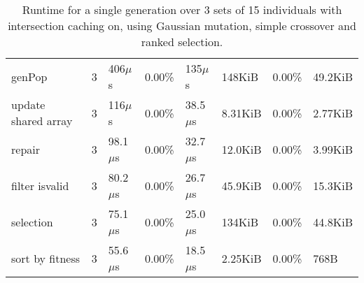 \begin{appendices}
\begin{table}
\begin{tabular}{l l l l l l l l}
     \hspace{12pt}genPop                      &   3  &  406\(\mu\)s & 0.00\% &  135\(\mu\)s   & 148KiB  &0.00\%  &49.2KiB\\
     \hspace{12pt}update shared array         &   3  &  116\(\mu\)s & 0.00\% & 38.5\(\mu\)s   &8.31KiB  &0.00\%  &2.77KiB\\
     \hspace{12pt}repair                      &   3  & 98.1\(\mu\)s & 0.00\% & 32.7\(\mu\)s   &12.0KiB  &0.00\%  &3.99KiB\\
     \hspace{12pt}filter isvalid              &   3  & 80.2\(\mu\)s & 0.00\% & 26.7\(\mu\)s   &45.9KiB  &0.00\%  &15.3KiB\\
     \hspace{12pt}selection                   &   3  & 75.1\(\mu\)s & 0.00\% & 25.0\(\mu\)s   & 134KiB  &0.00\%  &44.8KiB\\
     \hspace{12pt}sort by fitness             &   3  & 55.6\(\mu\)s & 0.00\% & 18.5\(\mu\)s   &2.25KiB  &0.00\%  &   768B\\
      \hline
  \end{tabular}
  \caption{\label{app:tab:MARuntime} Runtime for a single generation over 3 sets of 15 individuals with intersection caching on, using Gaussian mutation, simple crossover and ranked selection.}
\end{table}

\end{appendices}


